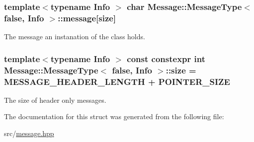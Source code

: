\subsubsection[{\texorpdfstring{message}{message}}]{\setlength{\rightskip}{0pt plus 5cm}template$<$typename Info $>$ char {\bf Message\+::\+Message\+Type}$<$ false, Info $>$\+::message\mbox{[}{\bf size}\mbox{]}}\hypertarget{struct_message_1_1_message_type_3_01false_00_01_info_01_4_af9557cb65a7883b01c7cbe30e6211f98}{}\label{struct_message_1_1_message_type_3_01false_00_01_info_01_4_af9557cb65a7883b01c7cbe30e6211f98}


The message an instanation of the class holds. 

\subsubsection[{\texorpdfstring{size}{size}}]{\setlength{\rightskip}{0pt plus 5cm}template$<$typename Info $>$ const constexpr int {\bf Message\+::\+Message\+Type}$<$ false, Info $>$\+::size = {\bf M\+E\+S\+S\+A\+G\+E\+\_\+\+H\+E\+A\+D\+E\+R\+\_\+\+L\+E\+N\+G\+TH} + {\bf P\+O\+I\+N\+T\+E\+R\+\_\+\+S\+I\+ZE}\hspace{0.3cm}{\ttfamily [static]}}\hypertarget{struct_message_1_1_message_type_3_01false_00_01_info_01_4_ab1478611666e0b38703dbb0512262d32}{}\label{struct_message_1_1_message_type_3_01false_00_01_info_01_4_ab1478611666e0b38703dbb0512262d32}


The size of header only messages. 



The documentation for this struct was generated from the following file\+:\begin{DoxyCompactItemize}
\item 
src/\hyperlink{message_8hpp}{message.\+hpp}\end{DoxyCompactItemize}
